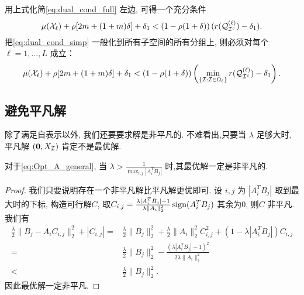 用上式化简\eqref{eq:dual_cond_full} 左边, 可得一个充分条件
\begin{equation}\label{eq:dual_cond_simp}
  \mu(\mathcal{X}_{\ell}) +\rho [2m+(1+m)\delta] +\delta_1
  < \left(1-\rho(1+\delta)\right)(r(\mathcal{Q}_{\mathcal{I}^c}^{(\ell)})-\delta_1).
\end{equation}
把\eqref{eq:dual_cond_simp} 一般化到所有子空间的所有分组上,
则必须对每个\(\ell = 1,...,L\) 成立：
\begin{equation}\label{eq:Thm1_all}
  \mu(\mathcal{X}_{\ell}) +\rho [2m+(1+m)\delta] +\delta_1
  < \left(1-\rho(1+\delta)\right)\left(\min_{\{\mathcal{I}: \mathcal{I}\in \Omega_\ell\}}r(\mathcal{Q}^{(\ell)}_{\mathcal{I}^c})-\delta_1\right).
\end{equation}

\subsection{避免平凡解}\label{sec:avoid_trivial}
除了满足自表示以外, 我们还要要求解是非平凡的. 不难看出,只要当 \(\lambda\)
足够大时, 平凡解 \((\mathbf{0}, X_{\mathcal{I}})\) 肯定不是最优解.

\begin{lemma}\label{lemma:avoid_trivial}
  对于\eqref{eq:Opt_A_general},  当 \(\lambda > \frac{1}{\max_{i,j} |A_i^T
B_j|}\) 时,其最优解一定是非平凡的.
\end{lemma}
\begin{proof}
  我们只要说明存在一个非平凡解比平凡解更优即可. 设 \(i, j\) 为 \(|A_i^T
  B_j|\) 取到最大时的下标, 构造可行解\(C\), 
  取\(C_{i,j} = \frac{\lambda |A_i^T B_j|-1}{\lambda \|A_i\|_2^2} \operatorname{sign}(A_i^T B_j)\) 
  其余为\(0\), 则\(C\) 非平凡.我们有
  \begin{align*}
    \frac{\lambda}{2} \|B_j - A_i C_{i, j} \|_2^2 + |C_{i, j}| =& \frac{\lambda}{2}
    \|B_j\|_2^2 + \frac{\lambda}{2} \|A_i\|_2^2 C_{i,j}^2 +\left( 1-\lambda |A_i^T B_j|
    \right)C_{i,j} \\
    =&\frac{\lambda}{2} \|B_j\|_2^2 - \frac{(\lambda|A_i^T B_j| -1)^2}
    {2 \lambda \|A_i\|_2^2 }\\
    <& \frac{\lambda}{2} \|B_j\|_2^2. 
  \end{align*}
  因此最优解一定非平凡.
\end{proof}

